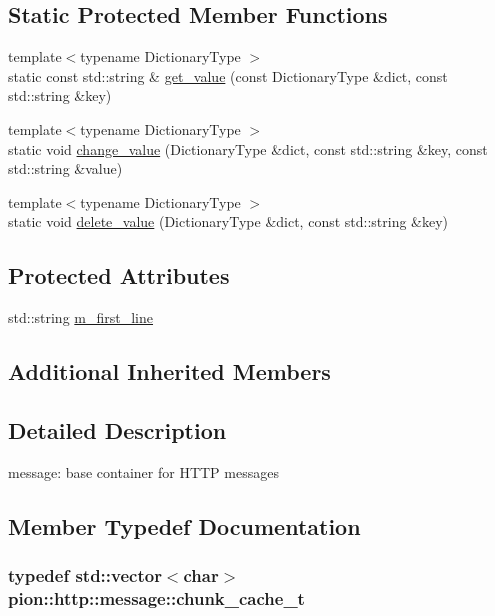 \subsection*{Static Protected Member Functions}
\begin{DoxyCompactItemize}
\item 
{\footnotesize template$<$typename Dictionary\-Type $>$ }\\static const std\-::string \& \hyperlink{classpion_1_1http_1_1message_ad6e365382874be8f3e28df1234e3a3f7}{get\-\_\-value} (const Dictionary\-Type \&dict, const std\-::string \&key)
\item 
{\footnotesize template$<$typename Dictionary\-Type $>$ }\\static void \hyperlink{classpion_1_1http_1_1message_a40603cf88819b33abb4e56bb55dc61af}{change\-\_\-value} (Dictionary\-Type \&dict, const std\-::string \&key, const std\-::string \&value)
\item 
{\footnotesize template$<$typename Dictionary\-Type $>$ }\\static void \hyperlink{classpion_1_1http_1_1message_a6d07488a5fa36e1e90622d64179f7953}{delete\-\_\-value} (Dictionary\-Type \&dict, const std\-::string \&key)
\end{DoxyCompactItemize}
\subsection*{Protected Attributes}
\begin{DoxyCompactItemize}
\item 
std\-::string \hyperlink{classpion_1_1http_1_1message_ad97c570395428af30074bd1b75672125}{m\-\_\-first\-\_\-line}
\end{DoxyCompactItemize}
\subsection*{Additional Inherited Members}


\subsection{Detailed Description}
message\-: base container for H\-T\-T\-P messages 

\subsection{Member Typedef Documentation}
\hypertarget{classpion_1_1http_1_1message_a4bcf1ea1d4e7a5637d04ae109adb5e46}{
\subsubsection[{chunk\-\_\-cache\-\_\-t}]{\setlength{\rightskip}{0pt plus 5cm}typedef std\-::vector$<$char$>$ {\bf pion\-::http\-::message\-::chunk\-\_\-cache\-\_\-t}}}\label{classpion_1_1http_1_1message_a4bcf1ea1d4e7a5637d04ae109adb5e46}


